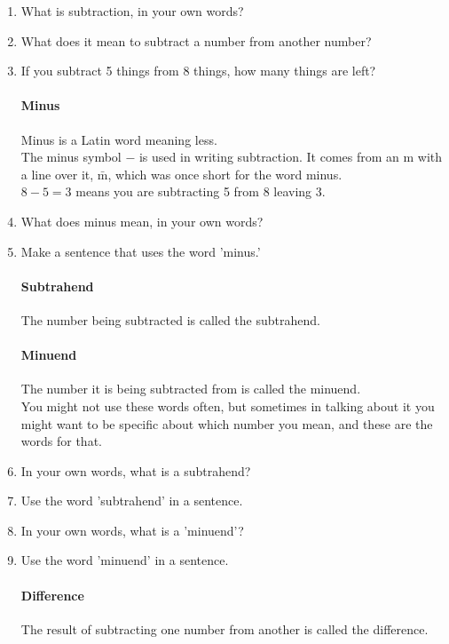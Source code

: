 \documentclass[12pt]{article}
\begin{document}
\begin{enumerate}

\item What is subtraction, in your own words?
\item What does it mean to subtract a number from another number?
\item If you subtract 5 things from 8 things, how many things are left?

\paragraph{Minus}
Minus is a Latin word meaning less.\\

The minus symbol $-$ is used in writing subtraction. It comes from an m with a line over it, $\bar{\textrm{m}}$, which was once short for the word minus.\\

$8-5=3$ means you are subtracting 5 from 8 leaving 3.

\item What does minus mean, in your own words?
\item Make a sentence that uses the word 'minus.'

\paragraph{Subtrahend}
The number being subtracted is called the subtrahend.

\paragraph{Minuend}
The number it is being subtracted from is called the minuend.\\

You might not use these words often, but sometimes in talking about it you might want to be specific about which number you mean, and these are the words for that.\\

\item In your own words, what is a subtrahend?
\item Use the word 'subtrahend' in a sentence.
\item In your own words, what is a 'minuend'?
\item Use the word 'minuend' in a sentence.

\paragraph{Difference}
The result of subtracting one number from another is called the difference.\\


\end{enumerate}
\end{document}
